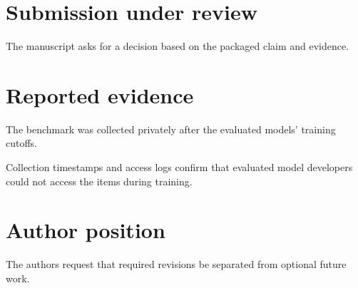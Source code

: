 \documentclass{article}
\begin{document}
\section{Submission under review}
The manuscript asks for a decision based on the packaged claim and evidence.
\section{Reported evidence}
The benchmark was collected privately after the evaluated models' training cutoffs.

Collection timestamps and access logs confirm that evaluated model developers could not access the items during training.
\section{Author position}
The authors request that required revisions be separated from optional future work.
\end{document}
